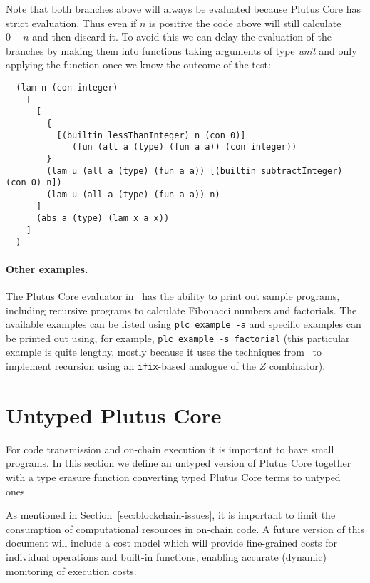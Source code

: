 \documentclass[a4paper]{article}
\begin{document}
Note that both branches above will always be evaluated because Plutus
Core has strict evaluation.  Thus even if $n$ is positive the code above will
still calculate $0-n$ and then discard it.  To avoid this we can delay
the evaluation of the branches by making them into functions taking
arguments of type \textit{unit} and only applying the function once we
know the outcome of the test:

\begin{verbatim}
  (lam n (con integer)
    [
      [
        {
          [(builtin lessThanInteger) n (con 0)]
             (fun (all a (type) (fun a a)) (con integer))
        }
        (lam u (all a (type) (fun a a)) [(builtin subtractInteger) (con 0) n])
        (lam u (all a (type) (fun a a)) n)
      ]
      (abs a (type) (lam x a x))
    ]
  )
\end{verbatim}

\paragraph{Other examples.} The Plutus Core evaluator in~\citep{Plutus-exe-repo}
has the ability to print out sample programs, including recursive
programs to calculate Fibonacci numbers and factorials.  The available
examples can be listed using \verb|plc example -a| and specific
examples can be printed out using, for example,
\verb|plc example -s factorial| (this particular example is quite lengthy, mostly because
it uses the techniques from~\citep{unravelling-recursion} to implement
recursion using an \verb|ifix|-based analogue of the $Z$ combinator).


\section{Untyped Plutus Core}
\label{sec:untyped-plc}
For code transmission and on-chain execution it is important to have
small programs.  In this section we define an untyped version of
Plutus Core together with a type erasure function converting typed
Plutus Core terms to untyped ones.

As mentioned in Section~\ref{sec:blockchain-issues}, it is important to
limit the consumption of computational resources in on-chain code.  A
future version of this document will include a cost model which will
provide fine-grained costs for individual operations and built-in
functions, enabling accurate (dynamic) monitoring of execution costs.
\end{document}
